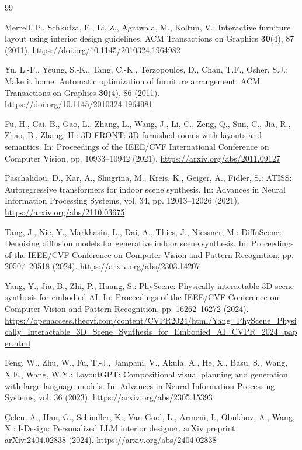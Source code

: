 \documentclass[pdflatex,sn-mathphys-num]{sn-jnl}
\begin{document}
\begin{thebibliography}{99}

Merrell, P., Schkufza, E., Li, Z., Agrawala, M., Koltun, V.:
Interactive furniture layout using interior design guidelines.
ACM Transactions on Graphics \textbf{30}(4), 87 (2011).
\url{https://doi.org/10.1145/2010324.1964982}

Yu, L.-F., Yeung, S.-K., Tang, C.-K., Terzopoulos, D., Chan, T.F., Osher, S.J.:
Make it home: Automatic optimization of furniture arrangement.
ACM Transactions on Graphics \textbf{30}(4), 86 (2011).
\url{https://doi.org/10.1145/2010324.1964981}

Fu, H., Cai, B., Gao, L., Zhang, L., Wang, J., Li, C., Zeng, Q., Sun, C.,
Jia, R., Zhao, B., Zhang, H.:
3D-FRONT: 3D furnished rooms with layouts and semantics.
In: Proceedings of the IEEE/CVF International Conference on Computer Vision,
pp. 10933--10942 (2021).
\url{https://arxiv.org/abs/2011.09127}

Paschalidou, D., Kar, A., Shugrina, M., Kreis, K., Geiger, A., Fidler, S.:
ATISS: Autoregressive transformers for indoor scene synthesis.
In: Advances in Neural Information Processing Systems, vol. 34,
pp. 12013--12026 (2021).
\url{https://arxiv.org/abs/2110.03675}

Tang, J., Nie, Y., Markhasin, L., Dai, A., Thies, J., Niessner, M.:
DiffuScene: Denoising diffusion models for generative indoor scene synthesis.
In: Proceedings of the IEEE/CVF Conference on Computer Vision and Pattern
Recognition, pp. 20507--20518 (2024).
\url{https://arxiv.org/abs/2303.14207}

Yang, Y., Jia, B., Zhi, P., Huang, S.:
PhyScene: Physically interactable 3D scene synthesis for embodied AI.
In: Proceedings of the IEEE/CVF Conference on Computer Vision and Pattern
Recognition, pp. 16262--16272 (2024).
\url{https://openaccess.thecvf.com/content/CVPR2024/html/Yang_PhyScene_Physically_Interactable_3D_Scene_Synthesis_for_Embodied_AI_CVPR_2024_paper.html}

Feng, W., Zhu, W., Fu, T.-J., Jampani, V., Akula, A., He, X., Basu, S.,
Wang, X.E., Wang, W.Y.:
LayoutGPT: Compositional visual planning and generation with large language
models. In: Advances in Neural Information Processing Systems, vol. 36
(2023). \url{https://arxiv.org/abs/2305.15393}

Çelen, A., Han, G., Schindler, K., Van Gool, L., Armeni, I., Obukhov, A.,
Wang, X.:
I-Design: Personalized LLM interior designer.
arXiv preprint arXiv:2404.02838 (2024).
\url{https://arxiv.org/abs/2404.02838}


\end{thebibliography}
\end{document}
